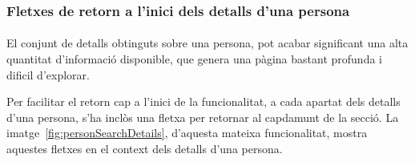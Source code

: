 \subsubsection{Fletxes de retorn a l'inici dels detalls d'una persona}

\paragraph{}
El conjunt de detalls obtinguts sobre una persona, pot acabar significant una alta quantitat d'informació disponible, que genera una pàgina bastant profunda i dificil d'explorar.

Per facilitar el retorn cap a l'inici de la funcionalitat, a cada apartat dels detalls d'una persona, s'ha inclòs una fletxa per retornar al capdamunt de la secció. La imatge~\ref{fig:personSearchDetails}, d'aquesta mateixa funcionalitat, mostra aquestes fletxes en el context dels detalls d’una persona.

